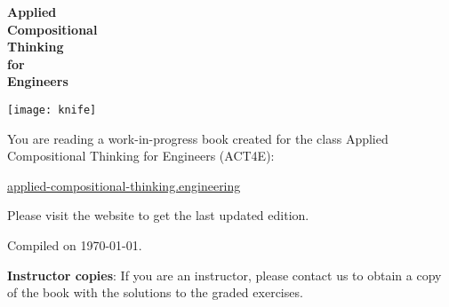 \thispagestyle{empty}
\begin{center}

    \vspace{3cm}
    {\Huge\bfseries Applied\\[3mm]Compositional\\[3mm]Thinking
        \\[3mm]for\\[2mm] Engineers}%

\end{center}

\vfill
\begin{center}
    \texttt{[image: knife]}
\end{center}

\vfill
\clearpage
\vfill
You are reading a work-in-progress book created for the class Applied Compositional Thinking for Engineers (ACT4E):

\href{https://applied-compositional-thinking.engineering}{applied-compositional-thinking.engineering}

Please visit the website to get the last updated edition.

Compiled on \today.

\vspace{3cm}

\textbf{Instructor copies}: If you are an instructor, please contact us to obtain a copy of the book with the solutions to the graded exercises.

